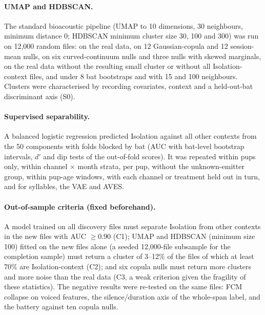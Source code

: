 \paragraph{UMAP and HDBSCAN.} The standard bioacoustic pipeline \cite{mcinnes2018,sainburg2020,thomas2022} (UMAP to 10 dimensions, 30 neighbours, minimum distance 0; HDBSCAN minimum cluster size 30, 100 and 300) was run on 12,000 random files: on the real data, on 12 Gaussian-copula and 12 session-mean nulls, on six curved-continuum nulls and three nulls with skewed marginals, on the real data without the resulting small cluster or without all Isolation-context files, and under 8 bat bootstraps and with 15 and 100 neighbours. Clusters were characterised by recording covariates, context and a held-out-bat discriminant axis (S0).

\paragraph{Supervised separability.} A balanced logistic regression predicted Isolation against all other contexts from the 50 components with folds blocked by bat (AUC with bat-level bootstrap intervals, $d'$ and dip tests of the out-of-fold scores). It was repeated within pups only, within channel $\times$ month strata, per pup, without the unknown-emitter group, within pup-age windows, with each channel or treatment held out in turn, and for syllables, the VAE and AVES.

\paragraph{Out-of-sample criteria (fixed beforehand).} A model trained on all discovery files must separate Isolation from other contexts in the new files with AUC $\ge0.90$ (C1); UMAP and HDBSCAN (minimum size 100) fitted on the new files alone (a seeded 12,000-file subsample for the completion sample) must return a cluster of 3--12\% of the files of which at least 70\% are Isolation-context (C2); and six copula nulls must return more clusters and more noise than the real data (C3, a weak criterion given the fragility of these statistics). The negative results were re-tested on the same files: FCM collapse on voiced features, the silence/duration axis of the whole-span label, and the battery against ten copula nulls.

